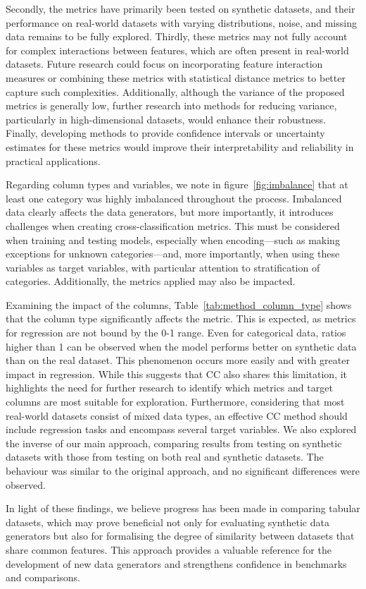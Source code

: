 Secondly, the metrics have primarily been tested on synthetic datasets, and their performance on real-world datasets with varying distributions, noise, and missing data remains to be fully explored. Thirdly, these metrics may not fully account for complex interactions between features, which are often present in real-world datasets. Future research could focus on incorporating feature interaction measures or combining these metrics with statistical distance metrics to better capture such complexities. Additionally, although the variance of the proposed metrics is generally low, further research into methods for reducing variance, particularly in high-dimensional datasets, would enhance their robustness. Finally, developing methods to provide confidence intervals or uncertainty estimates for these metrics would improve their interpretability and reliability in practical applications.

Regarding column types and variables, we note in figure~\ref{fig:imbalance} that at least one category was highly imbalanced throughout the process. Imbalanced data clearly affects the data generators, but more importantly, it introduces challenges when creating cross-classification metrics. This must be considered when training and testing models, especially when encoding—such as making exceptions for unknown categories—and, more importantly, when using these variables as target variables, with particular attention to stratification of categories. Additionally, the metrics applied may also be impacted.

Examining the impact of the columns, Table~\ref{tab:method_column_type} shows that the column type significantly affects the metric. This is expected, as metrics for regression are not bound by the 0-1 range. Even for categorical data, ratios higher than 1 can be observed when the model performs better on synthetic data than on the real dataset. This phenomenon occurs more easily and with greater impact in regression. While this suggests that CC also shares this limitation, it highlights the need for further research to identify which metrics and target columns are most suitable for exploration. Furthermore, considering that most real-world datasets consist of mixed data types, an effective CC method should include regression tasks and encompass several target variables. We also explored the inverse of our main approach, comparing results from testing on synthetic datasets with those from testing on both real and synthetic datasets. The behaviour was similar to the original approach, and no significant differences were observed.

In light of these findings, we believe progress has been made in comparing tabular datasets, which may prove beneficial not only for evaluating synthetic data generators but also for formalising the degree of similarity between datasets that share common features. This approach provides a valuable reference for the development of new data generators and strengthens confidence in benchmarks and comparisons.